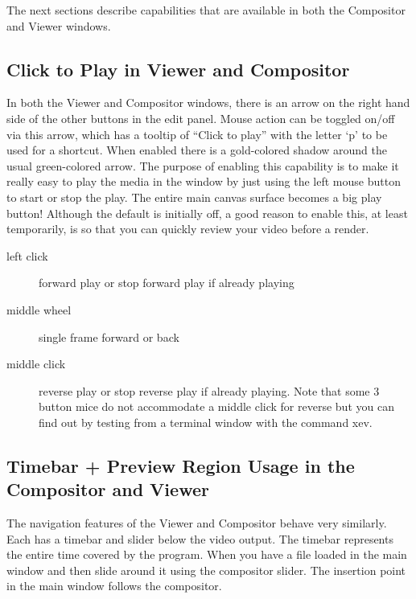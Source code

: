 The next sections describe capabilities that are available in both the Compositor and Viewer windows.

\subsection{Click to Play in Viewer and Compositor}%
\label{sub:click_to_play_in_viewer_and_compositor}

In both the Viewer and Compositor windows, there is an arrow on the right hand side of the other buttons in the edit panel.  
Mouse action can be toggled on/off via this arrow, which has a tooltip of “Click to play” with the letter ‘p’ to be used for a shortcut.  
When enabled there is a gold-colored shadow around the usual green-colored arrow.  
The purpose of enabling this capability is to make it really easy to play the media in the window by just using the left mouse button to start or stop the play.  
The entire main canvas surface becomes a big play button!  
Although the default is initially off, a good reason to enable this, at least temporarily, is so that you can quickly review your video before a render. 
 
\begin{description}
    \item[left click]          forward play or stop forward play if already playing
    \item[middle wheel]  single frame forward or back
    \item[middle click]    reverse play or stop reverse play if already playing. 
        Note that some 3 button mice do not accommodate a middle click for reverse but you can find out by testing from a terminal window with the command xev.
\end{description}

\subsection{Timebar + Preview Region Usage in the Compositor and Viewer}%
\label{sub:timebar_preview_region_usage_in_the_compositor_and_viewer}

The navigation features of the Viewer and Compositor behave very similarly. 
Each has a timebar and slider below the video output. 
The timebar represents the entire time covered by the program.   
When you have a file loaded in the main window and then slide around it using the compositor slider. The insertion point in the main window follows the compositor. 

